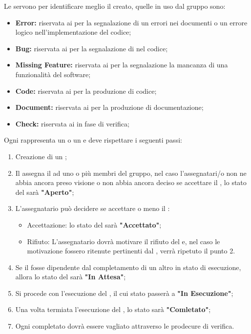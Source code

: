 \documentclass[12pt,a4paper]{article}
\begin{document}
\label{ticketEtichette}
Le  servono per identificare meglio il \textit{} creato, quelle in uso dal gruppo sono:
\begin{itemize}
	\item \textbf{Error:} riservata ai \textit{} per la segnalazione di  un errori nei documenti o un errore logico nell'implementazione del codice;
	\item \textbf{Bug:} riservata ai \textit{} per la segnalazione di  nel codice;
	\item \textbf{Missing Feature:} riservata ai \textit{} per la segnalazione la mancanza di una funzionalità del software;
	\item \textbf{Code:} riservata ai \textit{} per la produzione di codice;
	\item \textbf{Document:} riservata ai \textit{} per la produzione di documentazione;
	\item \textbf{Check:} riservata ai \textit{} in fase di verifica;
\end{itemize}

\label{ticketCicloVita}
Ogni \textit{} rappresenta un  o un \textit{} e deve rispettare i seguenti passi:
\begin{enumerate}
	\item Creazione di un \textit{};
	\item Il \PM{} assegna il \textit{} ad uno o più membri del gruppo, nel caso l'assegnatari/o non ne abbia ancora preso visione o non abbia ancora deciso se accettare il \textit{}, lo stato del \textit{} sarà \textbf{"Aperto"};
	\item L'assegnatario può decidere se accettare o meno il \textit{}: 
	\begin{itemize}
		\item Accettazione: lo stato del \textit{} sarà \textbf{"Accettato"};
		\item Rifiuto: L'assegnatario dovrà motivare il rifiuto del \textit{} e, nel caso le motivazione fossero ritenute pertinenti dal \PM{}, verrà ripetuto il punto 2.
	\end{itemize}
	\item Se il \textit{} fosse dipendente dal completamento di un altro \textit{} in stato di esecuzione, allora lo stato del \textit{} sarà \textbf{"In Attesa"};
	\item Si procede con l'esecuzione del \textit{}, il cui stato passerà a \textbf{"In Esecuzione"};
	\item Una volta termiata l'esecuzione del \textit{}, lo stato sarà \textbf{"Comletato"};
	\item Ogni \textit{} completato dovrà essere vagliato attraverso le prodecure di verifica.
\end{enumerate}
\end{document}
